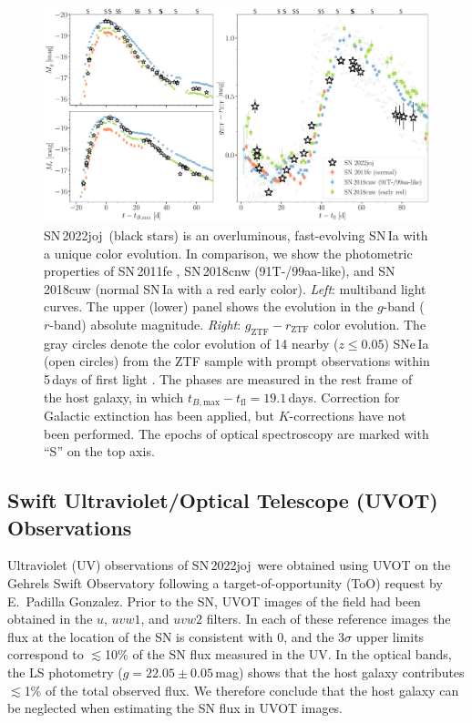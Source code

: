 \documentclass[twocolumn]{aastex631}
\newcommand{\sn}{SN\,2022joj}
\begin{document}
\begin{CJK*}{UTF8}{gbsn}
\begin{figure}
    \centering
    \includegraphics[width=\textwidth]{photometry.pdf}
    \caption{\sn\ (black stars) is an overluminous, fast-evolving SN\,Ia with a unique color evolution. In comparison, we show the photometric properties of SN\,2011fe \citep[normal SN\,Ia;][]{Pereira_2013}, SN\,2018cnw (91T-/99aa-like), and SN\,2018cuw (normal SN\,Ia with a red early color). \textit{Left}: multiband light curves. The upper (lower) panel shows the evolution in the $g$-band ($r$-band) absolute magnitude.
    \textit{Right}: $g_\mathrm{ZTF}-r_\mathrm{ZTF}$ color evolution. 
    The gray circles denote the color evolution of 14 nearby ($z\le0.05$) SNe\,Ia (open circles) from the ZTF sample with prompt observations within 5\,days of first light \citep{Bulla2020}. The phases are measured in the rest frame of the host galaxy, in which $t_{B, \mathrm{max}} - t_\mathrm{fl}=19.1$\,days. Correction for Galactic extinction has been applied, but $K$-corrections have not been performed. The epochs of optical spectroscopy are marked with ``S'' on the top axis.}
    \label{fig:lc}
\end{figure}

\subsection{Swift Ultraviolet/Optical Telescope (UVOT) Observations}
Ultraviolet (UV) observations of \sn\ were obtained using UVOT \citep{UVOT_2005} on the Gehrels Swift Observatory \citep[Swift;][]{Swift_2004} following a target-of-opportunity (ToO) request by E.~Padilla Gonzalez. Prior to the SN, UVOT images of the field had been obtained in the $u$, $uvw1$, and $uvw2$ filters. In each of these reference images the flux at the location of the SN is consistent with 0, and the 3$\sigma$ upper limits correspond to $\lesssim$10\% of the SN flux measured in the UV. In the optical bands, the LS photometry ($g = 22.05\pm0.05$\,mag) shows that the host galaxy contributes $\lesssim$1\% of the total observed flux. We therefore conclude that the host galaxy can be neglected when estimating the SN flux in UVOT images.


\end{CJK*}
\end{document}
